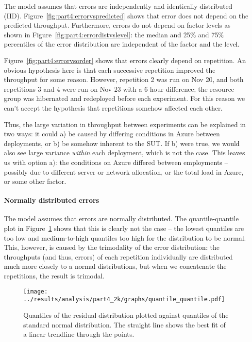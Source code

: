 \documentclass[11pt]{article}
\begin{document}
The model assumes that errors are independently and identically distributed (IID). Figure~\ref{fig:part4:errorvspredicted} shows that error does not depend on the predicted throughput. Furthermore, errors do not depend on factor levels as shown in Figure~\ref{fig:part4:errordistvslevel}: the median and 25\% and 75\% percentiles of the error distribution are independent of the factor and the level.

Figure~\ref{fig:part4:errorvsorder} shows that errors clearly depend on repetition. An obvious hypothesis here is that each successive repetition improved the throughput for some reason. However, repetition 2 was run on Nov 20, and both repetitions 3 and 4 were run on Nov 23 with a 6-hour difference; the resource group was hibernated and redeployed before each experiment. For this reason we can't accept the hypothesis that repetitions somehow affected each other.

Thus, the large variation in throughput between experiments can be explained in two ways: it could a) be caused by differing conditions in Azure between deployments, or b) be somehow inherent to the SUT. If b) were true, we would also see large variance \emph{within} each deployment, which is not the case. This leaves us with option a): the conditions on Azure differed between employments -- possibly due to different server or network allocation, or the total load in Azure, or some other factor.

\paragraph{Normally distributed errors}

The model assumes that errors are normally distributed. The quantile-quantile plot in Figure~\ref{fig:part4:quantile_quantile} shows that this is clearly not the case -- the lowest quantiles are too low and medium-to-high quantiles too high for the distribution to be normal. This, however, is caused by the trimodality of the error distribution: the throughputs (and thus, errors) of each repetition individually are distributed much more closely to a normal distributions, but when we concatenate the repetitions, the result is trimodal.

\begin{figure}
\centering
\texttt{[image: ../results/analysis/part4\_2k/graphs/quantile\_quantile.pdf]}
\caption{Quantiles of the residual distribution plotted against quantiles of the standard normal distribution. The straight line shows the best fit of a linear trendline through the points.}
\label{fig:part4:quantile_quantile}
\end{figure}
\end{document}
